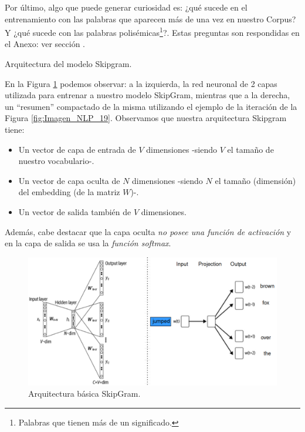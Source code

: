 \documentclass[12pt,a4paper]{article}
\makeatletter
\renewcommand\paragraph{\@startsection{paragraph}{4}{\z@}
            {-2.5ex\@plus -1ex \@minus -.25ex}
            {1.25ex \@plus .25ex}
            {\normalfont\normalsize\bfseries}}
\makeatother
\begin{document}
\begin{sloppypar}
Por último, algo que puede generar curiosidad es: ¿qué sucede en el entrenamiento con las palabras que aparecen más de una vez en nuestro Corpus? Y ¿qué sucede con las palabras polisémicas\footnote{Palabras que tienen más de un significado.}?. Estas preguntas son respondidas en el Anexo: ver sección \textit{}.

\cleardoublepage

\paragraph{Arquitectura del modelo Skipgram.}\label{skipgram}

En la Figura \ref{fig:Imagen_NLP_22} podemos observar: a la izquierda, la red neuronal de 2 capas utilizada para entrenar a nuestro modelo SkipGram, mientras que a la derecha, un “resumen” compactado de la misma utilizando el ejemplo de la iteración de la Figura \ref{fig:Imagen_NLP_19}.  Observamos que nuestra arquitectura Skipgram tiene:
\begin{itemize}
\item Un vector de capa de entrada de $V$ dimensiones -siendo $V$ el tamaño de nuestro vocabulario-.
\item Un vector de capa oculta de $N$ dimensiones -siendo $N$ el tamaño (dimensión) del embedding (de la matriz $W$)-. 
\item Un vector de salida también de $V$ dimensiones. 
\end{itemize}

Además, cabe destacar que la capa oculta \textit{no posee una función de activación} y en la capa de salida se usa la \textit{función softmax}. 

\begin{figure}[H]    
 \centering
 \includegraphics[width=1\textwidth]{images/NLP/22.png}
 \caption{Arquitectura básica SkipGram\cite{NLP_26}.}
 \label{fig:Imagen_NLP_22}
\end{figure}


\end{sloppypar}
\end{document}
